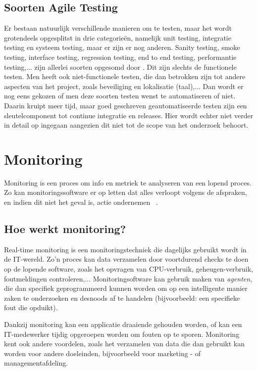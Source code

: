 \subsection{Soorten Agile Testing}
\label{sec:kindsOfTesting}

Er bestaan natuurlijk verschillende manieren om te testen, maar het wordt grotendeels opgesplitst in drie categorieën, namelijk unit testing, integratie testing en systeem testing, maar er zijn er nog anderen. Sanity testing, smoke testing, interface testing, regression testing, end to end testing, performantie testing,... zijn allerlei soorten opgesomd door \textcite{Pittet}. Dit zijn slechts de functionele testen. Men heeft ook niet-functionele testen, die dan betrokken zijn tot andere aspecten van het project, zoals beveiliging en lokalisatie (taal),... Dan wordt er nog eens gekozen of men deze soorten testen wenst te automatiseren of niet. Daarin kruipt meer tijd, maar goed geschreven geautomatiseerde testen zijn een sleutelcomponent tot continue integratie en releases. Hier wordt echter niet verder in detail op ingegaan aangezien dit niet tot de scope van het onderzoek behoort.

\section{Monitoring}
\label{sec:monitoring}

Monitoring is een proces om info en metriek te analyseren van een lopend proces. Zo kan monitoringssoftware er op letten dat alles verloopt volgens de afspraken, en indien dit niet het geval is, actie ondernemen ~\autocite{Rouse2018}. 

\subsection{Hoe werkt monitoring?}
\label{sec:howMonitoringWorks}

Real-time monitoring is een monitoringstechniek die dagelijks gebruikt wordt in de IT-wereld. Zo'n proces kan data verzamelen door voortdurend checks te doen op de lopende software, zoals het opvragen van CPU-verbruik, geheugen-verbruik, foutmeldingen controleren,... Monitoringsoftware kan gebruik maken van \textit{agenten}, die dan specifiek geprogrammeerd kunnen worden om op een intelligente manier zaken te onderzoeken en desnoods af te handelen (bijvoorbeeld: een specifieke fout die opduikt).

Dankzij monitoring kan een applicatie draaiende gehouden worden, of kan een IT-medewerker tijdig opgeroepen worden om fouten op te sporen. Monitoring kent ook andere voordelen, zoals het verzamelen van data die dan gebruikt kan worden voor andere doeleinden, bijvoorbeeld voor marketing - of managementafdeling. 

